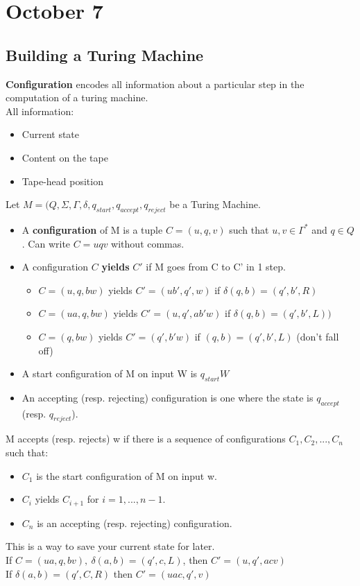 \section{October 7}
\subsection{Building a Turing Machine}
\begin{definition}
  \textbf{Configuration} encodes all information about a particular step in the computation of a turing machine.
  \\
  All information:
  \begin{itemize}
    \item Current state
    \item Content on the tape
    \item Tape-head position
  \end{itemize}
  Let $M = (Q, \Sigma, \Gamma, \delta, q_{start}, q_{accept}, q_{reject}$ be a Turing Machine.
  \begin{itemize}
    \item A \textbf{configuration} of M is a tuple $C=(u,q,v)$ such that $u,v \in \Gamma^{*}$ and $q \in Q$. Can write $C=uqv$ without commas.
    \item A configuration $C$ \textbf{yields} $C'$ if M goes from C to C' in 1 step.
    \begin{itemize}
      \item $C = (u, q, bw)$ yields $C' = (ub', q', w)$ if $\delta(q,b) = (q', b', R)$
      \item $C = (ua, q, bw)$ yields $C' =  (u,q',ab'w)$ if $\delta(q,b) = (q', b', L))$
      \item $C = (q,bw)$ yields $C' = (q',b'w)$ if $(q,b) = (q', b', L)$ (don't fall off)
    \end{itemize}
    \item A start configuration of M on input W is $q_{start}W$
    \item An accepting (resp.  rejecting) configuration is one where the state is $q_{accept}$ (resp.  $q_{reject}$). 
  \end{itemize} 
  M accepts (resp. rejects) w if there is a sequence of configurations $C_1, C_2, ... , C_n$ such that:
  \begin{itemize}
    \item $C_1$ is the start configuration of M on input w.
    \item $C_i$ yields $C_{i+1}$ for $i = 1,...,n-1$.
    \item $C_n$ is an accepting (resp. rejecting) configuration.
  \end{itemize}
\end{definition}
This is a way to save your current state for later.
\\
If $C = (ua, q, bv), \: \delta(a, b) = (q', c, L)$, then $C' = (u, q', acv)$
\\
If $\delta(a, b) = (q', C, R)$ then $C' = (uac, q', v)$
